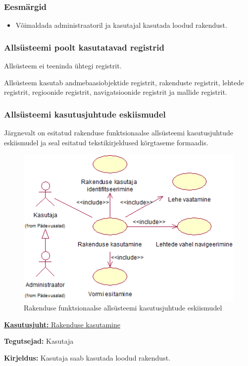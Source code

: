 \documentclass[a4paper,12pt]{article} %
\begin{document}
\subsubsection{Eesmärgid}
\begin{itemize}
\item Võimaldada administraatoril ja kasutajal kasutada loodud rakendust.
\end{itemize}
\subsubsection{Allsüsteemi poolt kasutatavad registrid}
Allsüsteem ei teeninda ühtegi registrit.\par
Allsüsteem kasutab andmebaasiobjektide registrit, rakenduste registrit, lehtede registrit, regioonide registrit, navigatsioonide registrit ja mallide registrit.
\subsubsection{Allsüsteemi kasutusjuhtude eskiismudel}
Järgnevalt on esitatud rakenduse funktsionaalse allsüsteemi kasutusjuhtude eskiismudel ja seal esitatud tekstikirjeldused kõrgtaseme formaadis.
\begin{figure}[H]
\begin{center}
\includegraphics[bb=0 0 432 301,scale=1]{./diagrams/application-subsystem-use-case-digram.png}
\caption{Rakenduse funktsionaalse allsüsteemi kasutusjuhtude eskiismudel}
\end{center}
\end{figure}

\underline{\textbf{Kasutusjuht:} Rakenduse kasutamine}
\par
\textbf{Tegutsejad:} Kasutaja
\par
\textbf{Kirjeldus:} Kasutaja saab kasutada loodud rakendust.
\par
\end{document}
